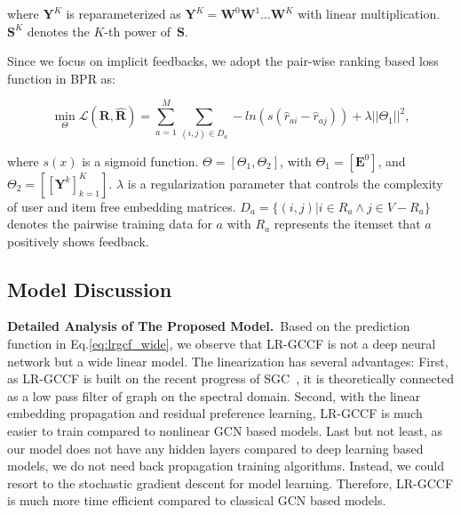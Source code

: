 \documentclass[letterpaper]{article} %
\newcommand{\Mat}[1]{\mathbf{#1}}
\begin{document}
\noindent where $\Mat{Y}^K$ is reparameterized as $\Mat{Y}^K\!=\!\Mat{W}^0\Mat{W}^1...\Mat{W}^K$ with linear multiplication.~$\Mat{S}^K$ denotes the $K$-th power of~$\Mat{S}$.




Since we focus on implicit feedbacks,  we adopt the  pair-wise ranking  based loss function in BPR as:


\begin{small}
	\begin{equation}\label{eq:loss_r}
	\min\limits_{\Theta} \mathcal{L}(\mathbf{R},\mathbf{\hat{R}})=\sum_{a=1}^M\sum\limits_{(i,j)\in D_a } - ln(s(\hat{r}_{ai}-\hat{r}_{aj})) +\lambda||\Theta_1||^2,
	\end{equation}
\end{small}

\noindent where $s(x)$ is a sigmoid function. {\small $\Theta\!=\![\Theta_1,\Theta_2]$}, with {\small $\Theta_1\!=\![\Mat{E}^0]$}, and
{\small $\Theta_2\!=\![{[\mathbf{Y}^k]}_{k=1}^{K}]$}.  $\lambda$ is a regularization parameter that controls the complexity of user and item free embedding matrices. {\small$D_a=\{(i,j)|i\in R_a\!\wedge\!j\in V-R_a\}$} denotes the pairwise training data for $a$ with {\small$R_a$} represents the itemset that $a$ positively shows feedback.


\subsection{Model Discussion}

\textbf{Detailed Analysis of The Proposed Model.}~Based on the prediction function in Eq.\eqref{eq:lrgcf_wide}, we observe that LR-GCCF is not a deep neural network but a wide linear model. The linearization has several advantages: First, as LR-GCCF is built on the recent progress of SGC~\cite{ICML2019simplifying}, it is theoretically connected as a low pass filter of graph on the spectral domain. Second, with the linear embedding propagation and residual preference learning, LR-GCCF is much easier to train compared to nonlinear GCN based models. Last but not least, as our model does not have any hidden layers compared to deep learning based models, we do not need back propagation training algorithms. Instead, we could resort to the stochastic gradient descent for model learning. Therefore, LR-GCCF is much more time efficient compared to classical GCN based models.
\end{document}
